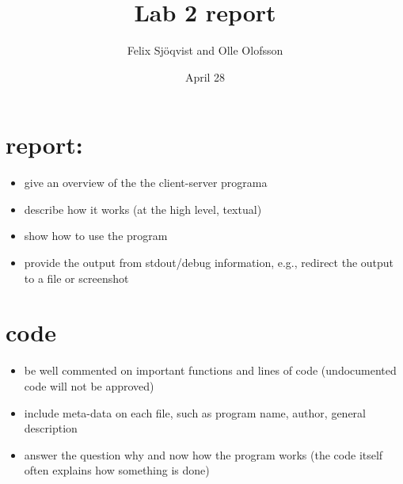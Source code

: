 \documentclass{article}
\title{Lab 2 report}
\author{Felix Sjöqvist and Olle Olofsson}
\date{April 28}
\begin{document}
\maketitle
\section{report:}
\begin{itemize}
    \item give an overview of the the client-server programa
    \item describe how it works (at the high level, textual)
    \item show how to use the program
    \item provide the output from stdout/debug information, e.g., redirect the output to a file or screenshot
\end{itemize}
\section{code}
\begin{itemize}
    \item be well commented on important functions and lines of code (undocumented code will not be approved)
    \item include meta-data on each file, such as program name, author, general description
    \item answer the question why and now how the program works (the code itself often explains how something is done)
\end{itemize}
\end{document}
